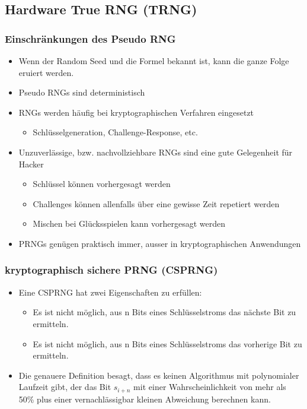\subsection{Hardware True RNG (TRNG)}

\subsubsection{Einschränkungen des Pseudo RNG}
\begin{itemize}
	\item Wenn der Random Seed und die Formel bekannt ist, kann die ganze Folge eruiert werden.
	\item Pseudo RNGs sind deterministisch
	\item RNGs werden häufig bei kryptographischen Verfahren eingesetzt
	\begin{itemize}
		\item Schlüsselgeneration, Challenge-Response, etc.
	\end{itemize}
	\item Unzuverlässige, bzw. nachvollziehbare RNGs sind eine gute Gelegenheit für Hacker
	\begin{itemize}
		\item Schlüssel können vorhergesagt werden
		\item Challenges können allenfalls über eine gewisse Zeit repetiert werden
		\item Mischen bei Glücksspielen kann vorhergesagt werden
	\end{itemize}
	\item PRNGs genügen praktisch immer, ausser in kryptographischen Anwendungen
\end{itemize}

\subsubsection{kryptographisch sichere PRNG (CSPRNG)}
\begin{itemize}
	\item Eine CSPRNG hat zwei Eigenschaften zu erfüllen:
	\begin{itemize}
		\item Es ist nicht möglich, aus n Bits eines Schlüsselstroms das nächste Bit zu ermitteln.
		\item Es ist nicht möglich, aus n Bits eines Schlüsselstroms das vorherige Bit zu ermitteln.
	\end{itemize}
	\item Die genauere Definition besagt, dass es keinen Algorithmus mit polynomialer Laufzeit gibt, der das Bit $s_{i+n}$ mit einer Wahrscheinlichkeit von mehr als 50\% plus einer vernachlässigbar kleinen Abweichung berechnen kann.
\end{itemize}

